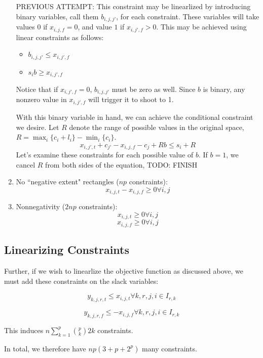 \documentclass[a4paper]{article}
\begin{document}
\begin{enumerate}
        PREVIOUS ATTEMPT:
        This constraint may be linearlized by introducing binary variables, call them $b_{i,j,j'}$, for each constraint. These variables will take values $0$ if $x_{i,j,f} = 0$, and value $1$ if $x_{i,j',f} > 0$. This may be achieved using linear constraints as follows:
        \begin{itemize}
            \item $b_{i,j,j'} \leq x_{i,j',f}$
            \item $s_i b \geq x_{i,j',f}$
        \end{itemize}
        Notice that if $x_{i,j',f} = 0$, $b_{i,j,j'}$ must be zero as well. Since $b$ is binary, any nonzero value in $x_{i,j',f}$ will trigger it to shoot to 1.

        \vspace{1em}

        With this binary variable in hand, we can achieve the conditional constraint we desire. Let $R$ denote the range of possible values in the original space, $R = \max_{i}\{c_i + l_i\} - \min_{i}\{c_i\}$.
        $$
        x_{i,j',t} + c_{j'} - x_{i,j,f} - c_j + Rb \leq s_i + R
        $$
        Let's examine these constraints for each possible value of $b$. If $b = 1$, we cancel $R$ from both sides of the equation, TODO: FINISH

    \item No ``negative extent" rectangles ($np$ constraints):
        $$x_{i,j,t} - x_{i,j,f} \geq 0 \forall i,j$$
    \item Nonnegativity ($2np$ constraints):
        $$x_{i,j,t} \geq 0 \forall i,j$$
        $$x_{i,j,f} \geq 0 \forall i,j$$
\end{enumerate}

\subsection{Linearizing Constraints}

Further, if we wish to linearlize the objective function as discussed above, we must add these constraints on the slack variables:

$$y_{k,j,r,t} \leq x_{i,j,t} \forall k,r,j,i \in I_{r,k}$$

$$y_{k,j,r,f} \leq -x_{i,j,f} \forall k,r,j,i \in I_{r,k}$$

This induces $n \sum_{k=1}^{p} {p\choose k} 2k$ constraints.

\vspace{2em}

In total, we therefore have $np(3 + p + 2^p)$ many constraints.
\end{document}
